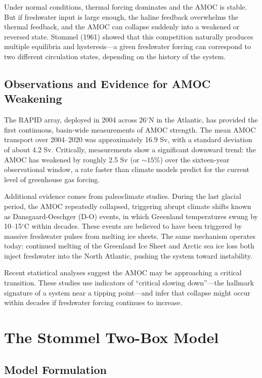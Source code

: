 \documentclass[12pt,letterpaper]{article}
\begin{document}
Under normal conditions, thermal forcing dominates and the AMOC is stable. But if freshwater input is large enough, the haline feedback overwhelms the thermal feedback, and the AMOC can collapse suddenly into a weakened or reversed state. Stommel (1961) showed that this competition naturally produces multiple equilibria and hysteresis---a given freshwater forcing can correspond to two different circulation states, depending on the history of the system.

\subsection{Observations and Evidence for AMOC Weakening}

The RAPID array, deployed in 2004 across 26$^\circ$N in the Atlantic, has provided the first continuous, basin-wide measurements of AMOC strength. The mean AMOC transport over 2004--2020 was approximately 16.9 Sv, with a standard deviation of about 4.2 Sv. Critically, measurements show a significant downward trend: the AMOC has weakened by roughly 2.5 Sv (or $\sim 15\%$) over the sixteen-year observational window, a rate faster than climate models predict for the current level of greenhouse gas forcing.

Additional evidence comes from paleoclimate studies. During the last glacial period, the AMOC repeatedly collapsed, triggering abrupt climate shifts known as Dansgaard-Oeschger (D-O) events, in which Greenland temperatures swung by 10--15$^\circ$C within decades. These events are believed to have been triggered by massive freshwater pulses from melting ice sheets. The same mechanism operates today: continued melting of the Greenland Ice Sheet and Arctic sea ice loss both inject freshwater into the North Atlantic, pushing the system toward instability.

Recent statistical analyses \citep{Ditlevsen2023, Boers2021} suggest the AMOC may be approaching a critical transition. These studies use indicators of ``critical slowing down''---the hallmark signature of a system near a tipping point---and infer that collapse might occur within decades if freshwater forcing continues to increase.

\section{The Stommel Two-Box Model}

\subsection{Model Formulation}
\end{document}
